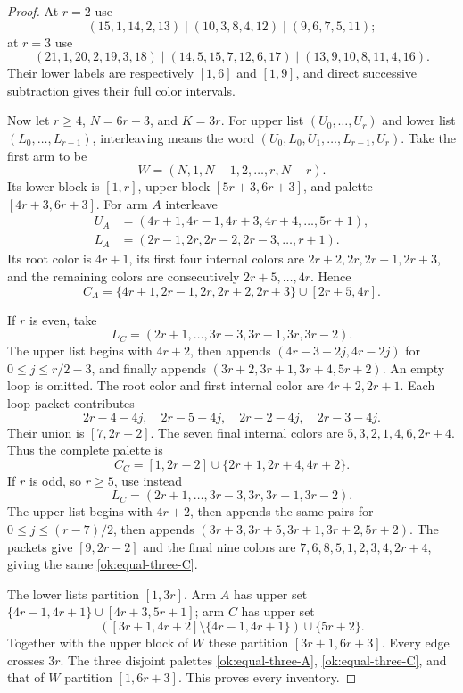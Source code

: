 \begin{proof}
At $r=2$ use
\[
 (15,1,14,2,13)\mid(10,3,8,4,12)\mid(9,6,7,5,11);
 \]
at $r=3$ use
\[
 (21,1,20,2,19,3,18)\mid
 (14,5,15,7,12,6,17)\mid(13,9,10,8,11,4,16).
 \]
Their lower labels are respectively $[1,6]$ and $[1,9]$,
and direct successive subtraction gives their full color intervals.

Now let $r\ge4$, $N=6r+3$, and $K=3r$.
For upper list $(U_0,\ldots,U_r)$ and lower list
$(L_0,\ldots,L_{r-1})$, interleaving means the word
$(U_0,L_0,U_1,\ldots,L_{r-1},U_r)$.
Take the first arm to be
\[
 W=(N,1,N-1,2,\ldots,r,N-r).
 \]
Its lower block is $[1,r]$, upper block $[5r+3,6r+3]$, and
palette $[4r+3,6r+3]$. For arm $A$ interleave
\begin{align*}
 U_A&=(4r+1,4r-1,4r+3,4r+4,\ldots,5r+1),\\
 L_A&=(2r-1,2r,2r-2,2r-3,\ldots,r+1).
\end{align*}
Its root color is $4r+1$, its first four internal colors are
$2r+2,2r,2r-1,2r+3$, and the remaining colors are consecutively
$2r+5,\ldots,4r$. Hence
\begin{equation}
 C_A=\{4r+1,2r-1,2r,2r+2,2r+3\}\cup[2r+5,4r].
 \label{ok:equal-three-A}
\end{equation}

If $r$ is even, take
\[
 L_C=(2r+1,\ldots,3r-3,3r-1,3r,3r-2).
 \]
The upper list begins with $4r+2$, then appends
$(4r-3-2j,4r-2j)$ for $0\le j\le r/2-3$, and finally appends
$(3r+2,3r+1,3r+4,5r+2)$. An empty loop is omitted.
The root color and first internal color are $4r+2,2r+1$.
Each loop packet contributes
\[
 2r-4-4j,\quad2r-5-4j,\quad2r-2-4j,\quad2r-3-4j.
 \]
Their union is $[7,2r-2]$. The seven final internal colors are
$5,3,2,1,4,6,2r+4$. Thus the complete palette is
\begin{equation}
 C_C=[1,2r-2]\cup\{2r+1,2r+4,4r+2\}.
 \label{ok:equal-three-C}
\end{equation}
If $r$ is odd, so $r\ge5$, use instead
\[
 L_C=(2r+1,\ldots,3r-3,3r,3r-1,3r-2).
 \]
The upper list begins with $4r+2$, then appends the same pairs
for $0\le j\le(r-7)/2$, then appends
$(3r+3,3r+5,3r+1,3r+2,5r+2)$.
The packets give $[9,2r-2]$ and the final nine colors are
$7,6,8,5,1,2,3,4,2r+4$, giving the same
\eqref{ok:equal-three-C}.

The lower lists partition $[1,3r]$. Arm $A$ has upper set
$\{4r-1,4r+1\}\cup[4r+3,5r+1]$; arm $C$ has upper set
\[
 ([3r+1,4r+2]\setminus\{4r-1,4r+1\})\cup\{5r+2\}.
 \]
Together with the upper block of $W$ these partition
$[3r+1,6r+3]$. Every edge crosses $3r$.
The three disjoint palettes
\eqref{ok:equal-three-A}, \eqref{ok:equal-three-C}, and that of
$W$ partition $[1,6r+3]$. This proves every inventory.
\end{proof}

